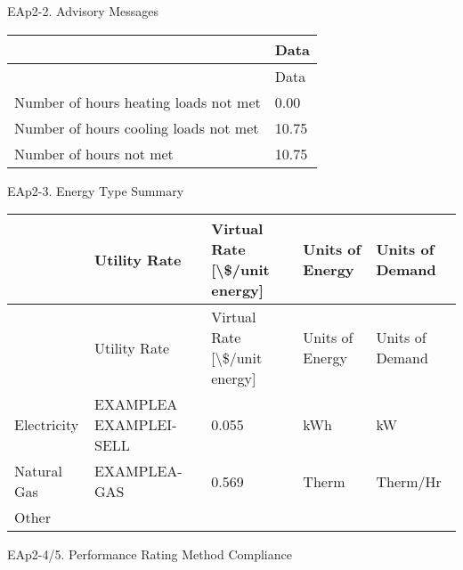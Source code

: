 EAp2-2. Advisory Messages

\begin{longtable}[c]{@{}ll@{}}
\toprule 
 & Data \tabularnewline
\midrule
\endfirsthead

\toprule 
 & Data \tabularnewline
\midrule
\endhead

Number of hours heating loads not met & 0.00 \tabularnewline
Number of hours cooling loads not met & 10.75 \tabularnewline
Number of hours not met & 10.75 \tabularnewline
\bottomrule
\end{longtable}

EAp2-3. Energy Type Summary

\begin{longtable}[c]{>{\raggedright}p{1.2in}>{\raggedright}p{1.2in}>{\raggedright}p{1.2in}>{\raggedright}p{1.2in}>{\raggedright}p{1.2in}}
\toprule 
 & Utility Rate & Virtual Rate [\textbackslash\$/unit energy] & Units of Energy & Units of Demand \tabularnewline
\midrule
\endfirsthead

\toprule 
 & Utility Rate & Virtual Rate [\textbackslash\$/unit energy] & Units of Energy & Units of Demand \tabularnewline
\midrule
\endhead

Electricity & EXAMPLEA EXAMPLEI-SELL & 0.055 & kWh & kW \tabularnewline
Natural Gas & EXAMPLEA-GAS & 0.569 & Therm & Therm/Hr \tabularnewline
Other & ~ & ~ & ~ & ~ \tabularnewline
\bottomrule
\end{longtable}

EAp2-4/5. Performance Rating Method Compliance

